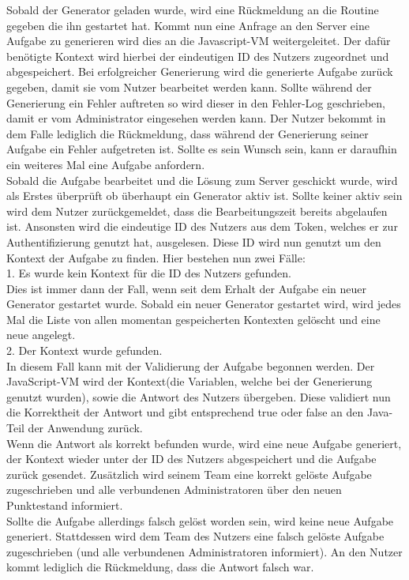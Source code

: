 Sobald der Generator geladen wurde, wird eine Rückmeldung an die Routine gegeben die ihn gestartet hat. Kommt nun eine Anfrage an den Server eine Aufgabe zu generieren wird dies an die Javascript-VM weitergeleitet. Der dafür benötigte Kontext wird hierbei der eindeutigen ID des Nutzers zugeordnet und abgespeichert. Bei erfolgreicher Generierung wird die generierte Aufgabe zurück gegeben, damit sie vom Nutzer bearbeitet werden kann. Sollte während der Generierung ein Fehler auftreten so wird dieser in den Fehler-Log geschrieben, damit er vom Administrator eingesehen werden kann. Der Nutzer bekommt in dem Falle lediglich die Rückmeldung, dass während der Generierung seiner Aufgabe ein Fehler aufgetreten ist. Sollte es sein Wunsch sein, kann er daraufhin ein weiteres Mal eine Aufgabe anfordern. \\

Sobald die Aufgabe bearbeitet und die Lösung zum Server geschickt wurde, wird als Erstes überprüft ob überhaupt ein Generator aktiv ist. Sollte keiner aktiv sein wird dem Nutzer zurückgemeldet, dass die Bearbeitungszeit bereits abgelaufen ist. Ansonsten wird die eindeutige ID des Nutzers aus dem Token, welches er zur Authentifizierung genutzt hat, ausgelesen. Diese ID wird nun genutzt um den Kontext der Aufgabe zu finden. Hier bestehen nun zwei Fälle: \\

1. Es wurde kein Kontext für die ID des Nutzers gefunden.\\
Dies ist immer dann der Fall, wenn seit dem Erhalt der Aufgabe ein neuer Generator gestartet wurde. Sobald ein neuer Generator gestartet wird, wird jedes Mal die Liste von allen momentan gespeicherten Kontexten gelöscht und eine neue angelegt. \\

2. Der Kontext wurde gefunden.\\
In diesem Fall kann mit der Validierung der Aufgabe begonnen werden. Der JavaScript-VM wird der Kontext(die Variablen, welche bei der Generierung genutzt wurden), sowie die Antwort des Nutzers übergeben. Diese validiert nun die Korrektheit der Antwort und gibt entsprechend true oder false an den Java-Teil der Anwendung zurück. \\
Wenn die Antwort als korrekt befunden wurde, wird eine neue Aufgabe generiert, der Kontext wieder unter der ID des Nutzers abgespeichert und die Aufgabe zurück gesendet. Zusätzlich wird seinem Team eine korrekt gelöste Aufgabe zugeschrieben und alle verbundenen Administratoren über den neuen Punktestand informiert. \\
Sollte die Aufgabe allerdings falsch gelöst worden sein, wird keine neue Aufgabe generiert. Stattdessen wird dem Team des Nutzers eine falsch gelöste Aufgabe zugeschrieben (und alle verbundenen Administratoren informiert). An den Nutzer kommt lediglich die Rückmeldung, dass die Antwort falsch war.

